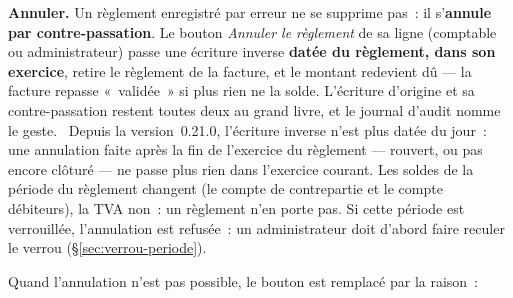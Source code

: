 \documentclass[a4paper,11pt,oneside]{article}
\begin{document}
\textbf{Annuler.} Un règlement enregistré par erreur ne se supprime pas~: il s'\textbf{annule par
contre-passation}. Le bouton \emph{Annuler le règlement} de sa ligne (comptable ou
administrateur) passe une écriture inverse \textbf{datée du règlement, dans son exercice}, retire
le règlement de la facture, et le montant redevient dû --- la facture repasse «~validée~» si plus
rien ne la solde. L'écriture d'origine et sa contre-passation restent toutes deux au grand livre, et
le journal d'audit nomme le geste. \keshAttention\ Depuis la version~0.21.0, l'écriture inverse
n'est plus datée du jour~: une annulation faite après la fin de l'exercice du règlement --- rouvert,
ou pas encore clôturé --- ne passe plus rien dans l'exercice courant. Les soldes de la période du
règlement changent (le compte de contrepartie et le compte débiteurs), la TVA non~: un règlement
n'en porte pas. Si cette période est verrouillée, l'annulation est refusée~: un administrateur
doit d'abord faire reculer le verrou (\S\ref{sec:verrou-periode}).

Quand l'annulation n'est pas possible, le bouton est remplacé par la raison~:
\end{document}
